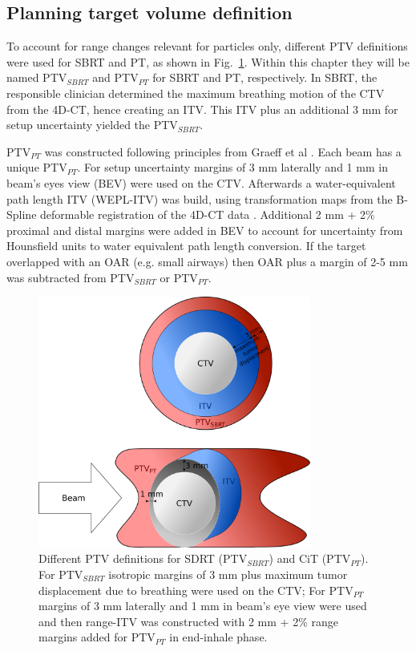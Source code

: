 \documentclass[type=dr, dr=rernat, acm$^3$entcolor=tud7b,colorbacktitle, bigchapter, openright, twoside, 12pt ]{tudthesis}
\begin{document}
\subsection{Planning target volume definition}

To account for range changes relevant for particles only, different PTV definitions were used for SBRT and PT, as shown in Fig.~\ref{Fig:PTV_def}. Within this chapter they will be named PTV$_{SBRT}$ and PTV$_{PT}$ for SBRT and PT, respectively.
In SBRT, the responsible clinician determined the maximum breathing motion of the CTV from the 4D-CT, hence creating an ITV. This ITV plus an additional 3 mm for setup uncertainty yielded the PTV$_{SBRT}$.

PTV$_{PT}$ was constructed following principles from Graeff et al \cite{Graeff2012}. Each beam has a unique PTV$_{PT}$. For setup uncertainty margins of 3 mm laterally and 1 mm in beam’s eyes view (BEV) were used on the CTV. Afterwards a water-equivalent path length ITV (WEPL-ITV) was build, using transformation maps from the B-Spline deformable registration of the 4D-CT data \cite{Shackleford2010}. Additional 2 mm + 2\% proximal and distal margins were added in BEV to account for uncertainty from Hounsfield units to water equivalent path length conversion.
If the target overlapped with an OAR (e.g. small airways) then OAR plus a margin of 2-5 mm was subtracted from PTV$_{SBRT}$ or PTV$_{PT}$.


\begin{figure}[H]
\begin{center}
\includegraphics[width=0.8\textwidth]{./Images/Figure1.png}
\caption{Different PTV definitions for SDRT (PTV$_{SBRT}$) and CiT (PTV$_{PT}$). For PTV$_{SBRT}$ isotropic margins of 3 mm plus maximum tumor displacement due to 
breathing were used on the CTV; For PTV$_{PT}$ margins of 3 mm laterally and 1 mm in beam’s eye view were used and then range-ITV was constructed with
2 mm + 2\% range margins added for PTV$_{PT}$ in end-inhale phase.}
\label{Fig:PTV_def}
\end{center}
\end{figure}
\end{document}

